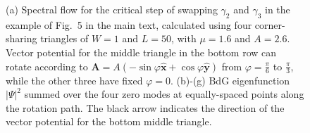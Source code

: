 \documentclass[aps,prb,showpacs,amsmath,amssymb,superscriptaddress]{revtex4-2}
\let\oldhat\hat
\renewcommand{\hat}[1]{\oldhat{\mathbf{#1}}}
\begin{document}
\begin{figure}[h]
  \caption{(a) Spectral flow for the critical step of swapping $\gamma_2$ and $\gamma_3$ in the example of Fig.~5 in the main text, calculated using four corner-sharing triangles of $W=1$ and $L=50$, with $\mu=1.6$ and $A=2.6$. Vector potential for the middle triangle in the bottom row can rotate according to $\mathbf A = A(-\sin\varphi \hat{x} + \cos\varphi \hat{y})$ from $\varphi = \frac{\pi}{6}$ to $\frac{\pi}{3}$, while the other three have fixed $\varphi = 0$. (b)-(g) BdG eigenfunction $|\Psi|^2$ summed over the four zero modes at equally-spaced points along the rotation path. The black arrow indicates the direction of the vector potential for the bottom middle triangle.}\label{fig: supp braiding}
\end{figure}

%
\end{document}
